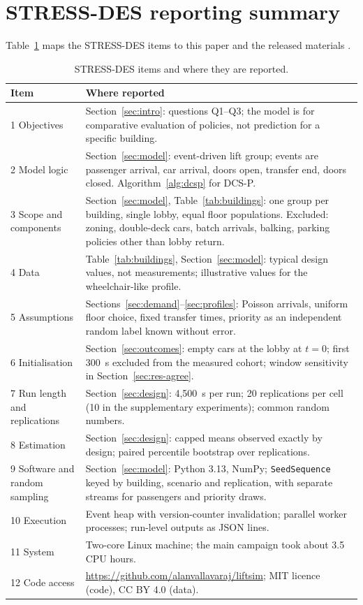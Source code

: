 \section{STRESS-DES reporting summary}\label{app:stress}
\setcounter{table}{0}
Table~\ref{tab:stress} maps the STRESS-DES items \cite{monks2019} to this paper and the released materials \cite{dataset}.

\begin{table}[htbp]\centering
\caption{STRESS-DES items and where they are reported.}\label{tab:stress}
\footnotesize
\begin{tabular}{@{}p{.27\linewidth}p{.68\linewidth}@{}}
\toprule Item & Where reported\\\midrule
1 Objectives & Section~\ref{sec:intro}: questions Q1--Q3; the model is for comparative evaluation of policies, not prediction for a specific building.\\
2 Model logic & Section~\ref{sec:model}: event-driven lift group; events are passenger arrival, car arrival, doors open, transfer end, doors closed. Algorithm~\ref{alg:dcsp} for DCS-P.\\
3 Scope and components & Section~\ref{sec:model}, Table~\ref{tab:buildings}: one group per building, single lobby, equal floor populations. Excluded: zoning, double-deck cars, batch arrivals, balking, parking policies other than lobby return.\\
4 Data & Table~\ref{tab:buildings}, Section~\ref{sec:model}: typical design values, not measurements; illustrative values for the wheelchair-like profile.\\
5 Assumptions & Sections~\ref{sec:demand}--\ref{sec:profiles}: Poisson arrivals, uniform floor choice, fixed transfer times, priority as an independent random label known without error.\\
6 Initialisation & Section~\ref{sec:outcomes}: empty cars at the lobby at $t=0$; first 300~s excluded from the measured cohort; window sensitivity in Section~\ref{sec:res-agree}.\\
7 Run length and replications & Section~\ref{sec:design}: 4,500~s per run; 20 replications per cell (10 in the supplementary experiments); common random numbers.\\
8 Estimation & Section~\ref{sec:design}: capped means observed exactly by design; paired percentile bootstrap over replications.\\
9 Software and random sampling & Section~\ref{sec:model}: Python 3.13, NumPy; \texttt{SeedSequence} keyed by building, scenario and replication, with separate streams for passengers and priority draws.\\
10 Execution & Event heap with version-counter invalidation; parallel worker processes; run-level outputs as JSON lines.\\
11 System & Two-core Linux machine; the main campaign took about 3.5 CPU hours.\\
12 Code access & \url{https://github.com/alanvallavaraj/liftsim}; MIT licence (code), CC BY 4.0 (data).\\
\bottomrule
\end{tabular}
\end{table}
